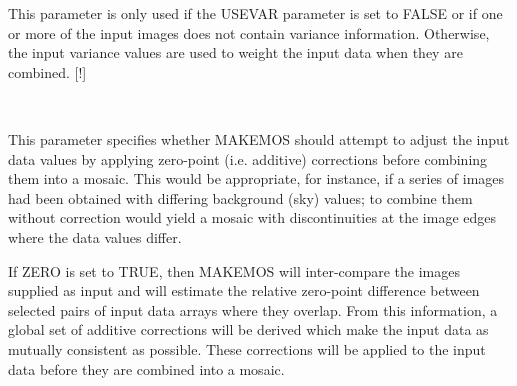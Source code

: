 \documentclass[twoside,11pt]{article}
\renewcommand{\_}{\texttt{\symbol{95}}}
\newcommand{\routine}[1]{{\sc #1}}
\newcommand{\sstsubsection}[1]{ \item[{#1}] \mbox{} \\}
\newcommand{\sstsubsection}[1]{\item[{#1}]}
\begin{document}
{{{         This parameter is only used if the USEVAR parameter is set to
         FALSE or if one or more of the input images does not contain
         variance information. Otherwise, the input variance values are
         used to weight the input data when they are combined.
         [!]
      }
      \sstsubsection{
         ZERO = \_LOGICAL (Read)
      } {
         This parameter specifies whether \routine{MAKEMOS} should attempt to
         adjust the input data values by applying zero-point (i.e.
         additive) corrections before combining them into a mosaic.
         This would be appropriate, for instance, if a series of images
         had been obtained with differing background (sky) values; to
         combine them without correction would yield a mosaic with
         discontinuities at the image edges where the data values
         differ.

         If ZERO is set to TRUE, then \routine{MAKEMOS} will inter-compare the
         images supplied as input and will estimate the relative
         zero-point difference between selected pairs of input data
         arrays where they overlap.  From this information, a global
         set of additive corrections will be derived which make the
         input data as mutually consistent as possible. These
         corrections will be applied to the input data before they are
         combined into a mosaic.

}}}
\end{document}
